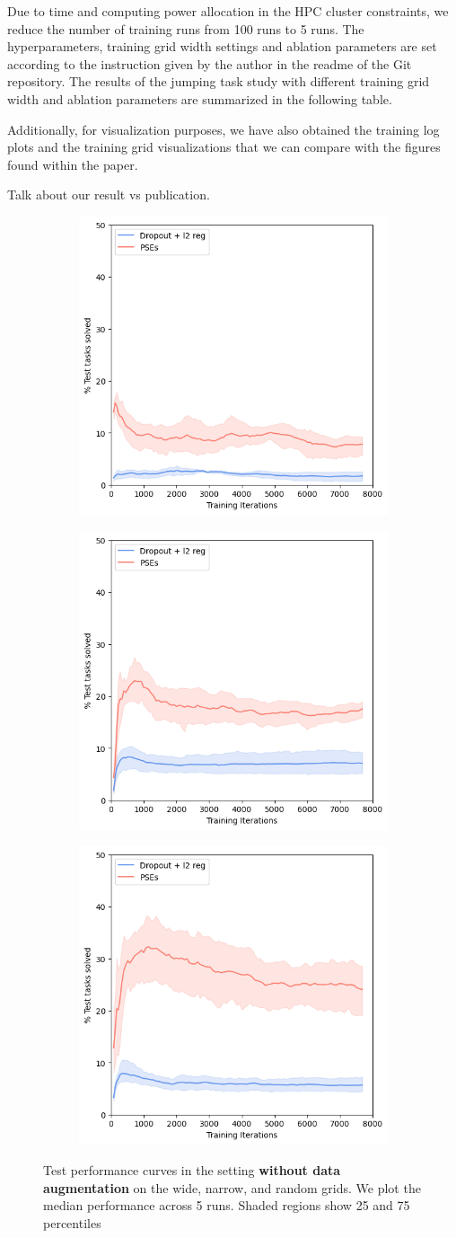 \documentclass{usiinftr}
\begin{document}
Due to time and computing power allocation in the HPC cluster constraints, we reduce the number of training runs from 100 runs to 5 runs. The hyperparameters, training grid width settings and ablation parameters are set according to the instruction given by the author in the readme of the Git repository. The results of the jumping task study with different training grid width and ablation parameters are summarized in the following table.


Additionally, for visualization purposes, we have also obtained the training log plots and the training grid visualizations that we can compare with the figures found within the paper.

Talk about our result vs publication.
\begin{figure}[h]
    \centering
    \begin{subfigure}
        \centering
        \includegraphics[width = 0.3\linewidth]{figures/narrow_without_data_aug.png}
        \label{}
    \end{subfigure}%
    \begin{subfigure}
        \centering
        \includegraphics[width = 0.3\linewidth]{figures/wide_without_data_aug.png}
        \label{}
    \end{subfigure}%
    \begin{subfigure}
        \centering
        \includegraphics[width = 0.3\linewidth]{figures/random_without_data_aug.png}
        \label{}
    \end{subfigure}%
    \caption{Test performance curves in the setting \textbf{without data augmentation} on the wide, narrow, and random grids. We plot the median performance across 5 runs. Shaded regions show 25 and 75 percentiles}
    \label{fig:ResultWithoutDataAug}
\end{figure}
\end{document}
